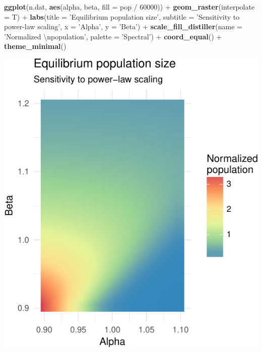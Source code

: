 \documentclass[]{article}
\newenvironment{Shaded}{}{}
\newcommand{\KeywordTok}[1]{\textcolor[rgb]{0.00,0.44,0.13}{\textbf{{#1}}}}
\newcommand{\DataTypeTok}[1]{\textcolor[rgb]{0.56,0.13,0.00}{{#1}}}
\newcommand{\DecValTok}[1]{\textcolor[rgb]{0.25,0.63,0.44}{{#1}}}
\newcommand{\CharTok}[1]{\textcolor[rgb]{0.25,0.44,0.63}{{#1}}}
\newcommand{\StringTok}[1]{\textcolor[rgb]{0.25,0.44,0.63}{{#1}}}
\newcommand{\NormalTok}[1]{{#1}}
\begin{document}
\begin{Shaded}
\begin{Highlighting}[]
\KeywordTok{ggplot}\NormalTok{(n.dat, }\KeywordTok{aes}\NormalTok{(alpha, beta, }\DataTypeTok{fill =} \NormalTok{pop /}\StringTok{ }\DecValTok{60000}\NormalTok{)) +}
\StringTok{  }\KeywordTok{geom_raster}\NormalTok{(}\DataTypeTok{interpolate =} \NormalTok{T) +}
\StringTok{  }\KeywordTok{labs}\NormalTok{(}\DataTypeTok{title =} \StringTok{'Equilibrium population size'}\NormalTok{, }\DataTypeTok{subtitle =} \StringTok{'Sensitivity to power-law scaling'}\NormalTok{, }\DataTypeTok{x =} \StringTok{'Alpha'}\NormalTok{, }\DataTypeTok{y =} \StringTok{'Beta'}\NormalTok{) +}
\StringTok{  }\KeywordTok{scale_fill_distiller}\NormalTok{(}\DataTypeTok{name =} \StringTok{'Normalized }\CharTok{\textbackslash{}n}\StringTok{population'}\NormalTok{, }\DataTypeTok{palette =} \StringTok{'Spectral'}\NormalTok{) +}
\StringTok{  }\KeywordTok{coord_equal}\NormalTok{() +}
\StringTok{  }\KeywordTok{theme_minimal}\NormalTok{()}
\end{Highlighting}
\end{Shaded}

\includegraphics{eq_pop_files/figure-latex/unnamed-chunk-3-1.pdf}
\end{document}
